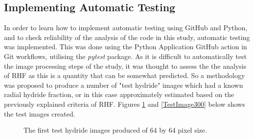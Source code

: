 \documentclass{article}
\begin{document}
\subsection{Implementing Automatic Testing}
    In order to learn how to implement automatic testing using GitHub and Python, and to check reliability of the analysis of the code in this study, automatic testing was implemented. This was done using the Python Application GitHub action in Git workflows, utilising the \textit{pytest} package. As it is difficult to automatically test the image processing steps of the study, it was thought to assess the the analysis of RHF as this is a quantity that can be somewhat predicted. So a methodology was proposed to produce a number of "test hydride" images which had a known radial hydride fraction, or in this case approximately estimated based on the previously explained criteria of RHF. Figures \ref{TestImages64} and \ref{TestImage300} below shows the test images created.

    \begin{figure}[H]
		\begin{center}
		\hspace{6pt} 
		\caption{The first test hydride images produced of 64 by 64 pixel size.}
		\label{TestImages64}
		\end{center}
	\end{figure}
\end{document}
